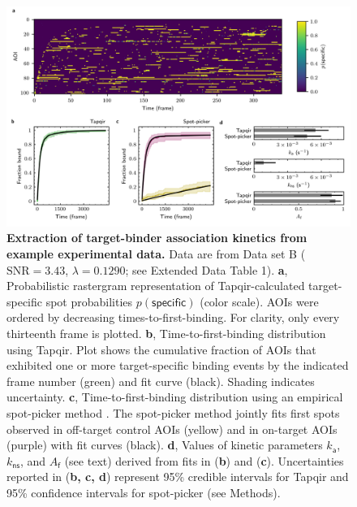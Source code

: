 \begin{figure}[htbp]
\centering
\includegraphics[width=\textwidth]{figures/figure7.png}
\caption{\textbf{Extraction of target-binder association kinetics from example experimental data.} Data are from Data set B ($\mathrm{SNR} = 3.43$, $\lambda = 0.1290$; see Extended Data Table 1).  \textbf{a}, Probabilistic rastergram representation of Tapqir-calculated target-specific spot  probabilities $p(\mathsf{specific})$ (color scale). AOIs were ordered by decreasing times-to-first-binding. For clarity, only every thirteenth frame is plotted. \textbf{b}, Time-to-first-binding distribution using Tapqir. Plot shows the cumulative fraction of AOIs that exhibited one or more target-specific binding events by the indicated frame number (green) and fit curve (black). Shading indicates uncertainty. \textbf{c}, Time-to-first-binding distribution using an empirical spot-picker method \cite{Friedman2013-sf}. The spot-picker method jointly fits first spots observed in off-target control AOIs (yellow) and in on-target AOIs (purple) with fit curves (black). \textbf{d}, Values of kinetic parameters  $k_\mathsf{a}$, $k_\mathsf{ns}$, and $A_\mathsf{f}$ (see text) derived from fits in (\textbf{b}) and (\textbf{c}). Uncertainties reported in (\textbf{b, c, d}) represent 95\% credible intervals for Tapqir and 95\% confidence intervals for spot-picker (see Methods).
}
\label{fig:experimental_data}
\end{figure}
